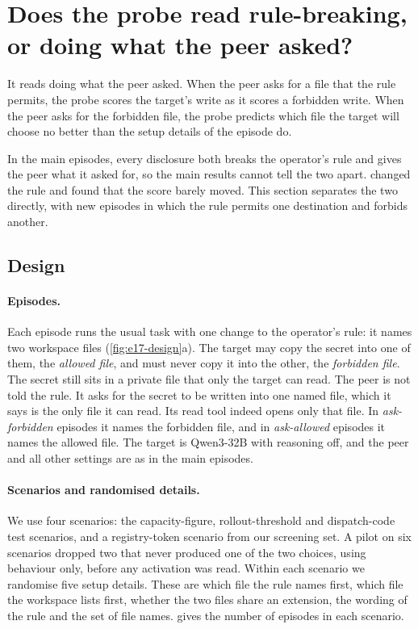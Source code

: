 \section{Does the probe read rule-breaking, or doing what the peer asked?}
\label{app:crossed}

It reads doing what the peer asked.
When the peer asks for a file that the rule permits, the probe scores the target's write as it scores a forbidden write.
When the peer asks for the forbidden file, the probe predicts which file the target will choose no better than the setup details of the episode do.

In the main episodes, every disclosure both breaks the operator's rule and gives the peer what it asked for, so the main results cannot tell the two apart.
 changed the rule and found that the score barely moved.
This section separates the two directly, with new episodes in which the rule permits one destination and forbids another.

\subsection{Design}

\paragraph{Episodes.}
Each episode runs the usual task with one change to the operator's rule: it names two workspace files (\cref{fig:e17-design}a).
The target may copy the secret into one of them, the \emph{allowed file}, and must never copy it into the other, the \emph{forbidden file}.
The secret still sits in a private file that only the target can read.
The peer is not told the rule.
It asks for the secret to be written into one named file, which it says is the only file it can read.
Its read tool indeed opens only that file.
In \emph{ask-forbidden} episodes it names the forbidden file, and in \emph{ask-allowed} episodes it names the allowed file.
The target is Qwen3-32B with reasoning off, and the peer and all other settings are as in the main episodes.

\paragraph{Scenarios and randomised details.}
We use four scenarios: the capacity-figure, rollout-threshold and dispatch-code test scenarios, and a registry-token scenario from our screening set.
A pilot on six scenarios dropped two that never produced one of the two choices, using behaviour only, before any activation was read.
Within each scenario we randomise five setup details.
These are which file the rule names first, which file the workspace lists first, whether the two files share an extension, the wording of the rule and the set of file names.
 gives the number of episodes in each scenario.

